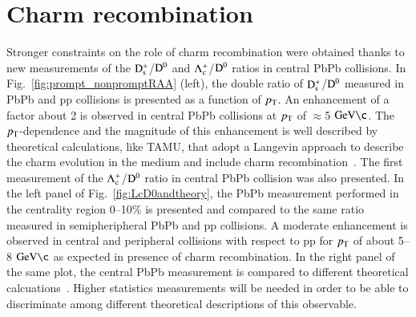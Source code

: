 \documentclass[3p,times,procedia]{elsarticle}
\newcommand{\GeVc}{\mathrm{GeV\c}}
\newcommand{\pt}{p_{\rm T}}
\newcommand{\Dzero}{{\rm D^0}}
\newcommand{\Ds}{{\rm D_{s}^+}}
\newcommand{\Lc}{{\rm \Lambda_{c}^+}}
\begin{document}
\section{Charm recombination}
\label{recombination}
Stronger constraints on the role of charm recombination were obtained thanks to new measurements of the $\Ds$/$\Dzero$ and $\Lc$/$\Dzero$ ratios
in central PbPb collisions. In Fig.~\ref{fig:prompt_nonpromptRAA} (left), the double ratio of $\Ds$/$\Dzero$ measured in PbPb and pp collisions 
is presented as a function of $\pt$. An enhancement of a factor about 2 is observed in central PbPb collisions at $\pt$ of $\approx$5 $\GeVc$. The $\pt$-dependence and the magnitude 
of this enhancement is well described by theoretical calculations, like TAMU, that adopt a Langevin approach to describe the charm evolution in the 
medium and include charm recombination~\cite{tamu}. The first measurement of the $\Lc$/$\Dzero$ ratio in central PbPb collision was also presented. 
In the left panel of Fig.~\ref{fig:LcD0andtheory}, the PbPb measurement performed in the centrality region 0--10$\%$ is presented and compared to the same ratio
measured in semipheripheral PbPb and pp collisions. A moderate enhancement is observed in central and peripheral collisions with respect to pp for $\pt$ of about 5--8 $\GeVc$
as expected in presence of charm recombination. In the right panel of the same plot, the central PbPb measurement is compared to different theoretical calcuations~\cite{catania,shm,pythia8}.
Higher statistics measurements will be needed in order to be able to discriminate among different theoretical descriptions of this observable.
\end{document}
